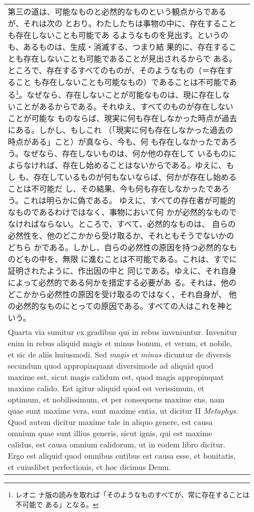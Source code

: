 \documentclass[10pt]{jsarticle}
\begin{document}
\begin{longtable}{p{21em}p{21em}}
第三の道は、可能なものと必然的なものという観点からであるが、それは次の
とおり。わたしたちは事物の中に、存在することも存在しないことも可能であ
るようなものを見出す。というのも、あるものは、生成・消滅する、つまり結
果的に、存在することも存在しないことも可能であることが見出されるからで
ある。ところで、存在するすべてのものが、そのようなもの（＝存在すること
も存在しないことも可能なもの）であることは不可能である\footnote{レオニ
ナ版の読みを取れば「そのようなものすべてが、常に存在することは不可能で
ある」となる。}。なぜなら、存在しないことが可能なものは、現に存在しな
いことがあるからである。それゆえ、すべてのものが存在しないことが可能な
ものならば、現実に何も存在しなかった時点が過去にある。しかし、もしこれ
（「現実に何も存在しなかった過去の時点がある」こと）が真なら、今も、何
も存在しなかったであろう。なぜなら、存在しないものは、何か他の存在して
いるものによらなければ、存在し始めることはないからである。ゆえに、もし
も、存在しているものが何もないならば、何かが存在し始めることは不可能だ
し、その結果、今も何も存在しなかったであろう。これは明らかに偽である。
ゆえに、すべての存在者が可能的なものであるわけではなく、事物において何
かが必然的なものでなければならない。ところで、すべて、必然的なものは、
自らの必然性を、他のどこかから受け取るか、それともそうでないかのどちら
かである。しかし、自らの必然性の原因を持つ必然的なものどもの中を、無限
に進むことは不可能である。これは、すでに証明されたように、作出因の中と
同じである。ゆえに、それ自身によって必然的である何かを措定する必要があ
る。それは、他のどこかから必然性の原因を受け取るのではなく、それ自身が、
他の必然的なものにとっての原因である。すべての人はこれを神という。



\\


Quarta via sumitur ex gradibus qui in rebus inveniuntur. Invenitur
enim in rebus aliquid magis et minus bonum, et verum, et nobile, et
sic de aliis huiusmodi. Sed {\it magis} et {\it minus} dicuntur de
diversis secundum quod appropinquant diversimode ad aliquid quod
maxime est, sicut magis calidum est, quod magis appropinquat maxime
calido. Est igitur aliquid quod est verissimum, et optimum, et
nobilissimum, et per consequens maxime ens, nam quae sunt maxime vera,
sunt maxime entia, ut dicitur II {\it Metaphys}. Quod autem dicitur
maxime tale in aliquo genere, est causa omnium quae sunt illius
generis, sicut ignis, qui est maxime calidus, est causa omnium
calidorum, ut in eodem libro dicitur. Ergo est aliquid quod omnibus
entibus est causa esse, et bonitatis, et cuiuslibet perfectionis, et
hoc dicimus Deum.



\end{longtable}
\end{document}
